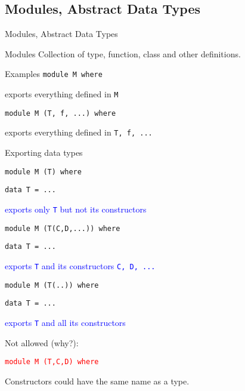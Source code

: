 \documentclass{beamer}
\def\code#1{\texttt{\frenchspacing#1}}
\begin{document}
\subsection{Modules, Abstract Data Types}

\begin{frame}{Modules, Abstract Data Types}

\begin{block}{Modules}
Collection of type, function, class and other definitions.

\pause

\begin{exampleblock}{Examples}
\code{module M where} \par
exports everything defined in \code{M}\pause

\vspace{0.25cm}
\code{module M (T, f, ...) where} \par
exports everything defined in \code{T, f, ...}
\end{exampleblock}
\end{block}

\end{frame}

\begin{frame}[fragile]{Exporting data types}

\code{module M (T) where} \par
\code{data T = ...} \par
\textcolor{blue}{exports only \code{T} but not its constructors}\pause

\vspace{0.25cm}
\code{module M (T(C,D,...)) where} \par
\code{data T = ...} \par
\textcolor{blue}{exports \code{T} and its constructors \code{C, D, ...}}\pause

\vspace{0.25cm}
\code{module M (T(..)) where} \par
\code{data T = ...} \par
\textcolor{blue}{exports \code{T} and all its constructors}\pause

\vspace{0.25cm}
Not allowed (why?): \par
\textcolor{red}{\code{module M (T,C,D) where}}

\pause

Constructors could have the same name as a type.

\end{frame}
\end{document}
